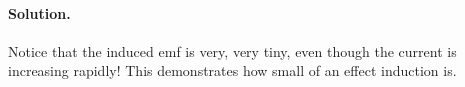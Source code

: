 \documentclass[11pt]{article}
\newenvironment{solution}
{
    \paragraph{Solution.}
    \ignorespaces
}
{
    \bigskip
}
\begin{document}
\begin{solution}
\begin{enumerate}
			Notice that the induced emf is very, very tiny, even though the current is increasing rapidly!  This demonstrates how small of an effect induction is.
	\end{enumerate}
\end{solution}
\end{document}

